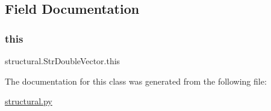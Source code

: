 \subsection{Field Documentation}
\mbox{\label{classstructural_1_1_str_double_vector_ad266eb00ada2c457e7099159b7a37998}} 
\subsubsection{\texorpdfstring{this}{this}}
{\footnotesize\ttfamily structural.\+Str\+Double\+Vector.\+this}



The documentation for this class was generated from the following file\+:\begin{DoxyCompactItemize}
\item 
\hyperlink{structural_8py}{structural.\+py}\end{DoxyCompactItemize}
